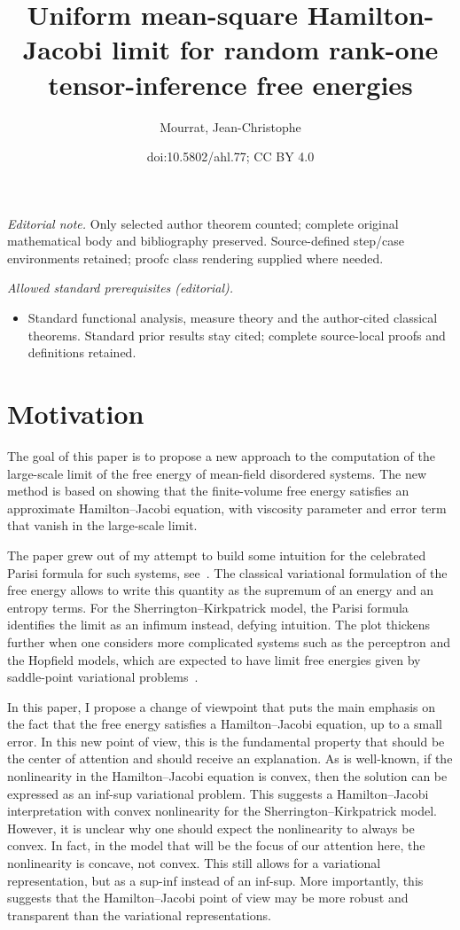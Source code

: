 \documentclass[10pt]{amsart}
\title{Uniform mean-square Hamilton-Jacobi limit for random rank-one tensor-inference free energies}
\author{Mourrat, Jean-Christophe}
\date{doi:10.5802/ahl.77; CC BY 4.0}
\theoremstyle{definition}\newtheorem{defi}[theo]{Definition}\newtheorem{rema}[theo]{Remark}\newtheorem{exam}[theo]{Example}\newtheorem{exem}[theo]{Example}\newtheorem{nota}[theo]{Notation}
\newcommand{\1}{\mathds{1}}
\begin{document}
\maketitle
\noindent\textit{Editorial note.} Only selected author theorem counted; complete original mathematical body and bibliography preserved. Source-defined step/case environments retained; proofc class rendering supplied where needed.\par\medskip
\noindent\textit{Allowed standard prerequisites (editorial).}\begin{itemize}
\item Standard functional analysis, measure theory and the author-cited classical theorems. Standard prior results stay cited; complete source-local proofs and definitions retained.
\end{itemize}\medskip


\section{Motivation}

The goal of this paper is to propose a new approach to the computation of the large-scale limit of the free energy of mean-field disordered systems. The new method is based on showing that the finite-volume free energy satisfies an approximate Hamilton--Jacobi equation, with viscosity parameter and error term that vanish in the large-scale limit.


The paper grew out of my attempt to build some intuition for the celebrated Parisi formula for such systems, see~\cite{guerra,MPV,pan,Tpaper,Tbook2}. The classical variational formulation of the free energy allows to write this quantity as the supremum of an energy and an entropy terms. For the Sherrington--Kirkpatrick model, the Parisi formula identifies the limit as an infimum instead, defying intuition. The plot thickens further when one considers more complicated systems such as the perceptron and the Hopfield models, which are expected to have limit free energies given by saddle-point variational problems~\cite{obnoxious}.


In this paper, I propose a change of viewpoint that puts the main emphasis on the fact that the free energy satisfies a Hamilton--Jacobi equation, up to a small error. In this new point of view, this is the fundamental property that should be the center of attention and should receive an explanation. As is well-known, if the nonlinearity in the Hamilton--Jacobi equation is convex, then the solution can be expressed as an inf-sup variational problem. This suggests a Hamilton--Jacobi interpretation with convex nonlinearity for the Sherrington--Kirkpatrick model. However, it is unclear why one should expect the nonlinearity to always be convex. In fact, in the model that will be the focus of our attention here, the nonlinearity is concave, not convex. This still allows for a variational representation, but as a sup-inf instead of an inf-sup. More importantly, this suggests that the Hamilton--Jacobi point of view may be more robust and transparent than the variational representations.
\end{document}
